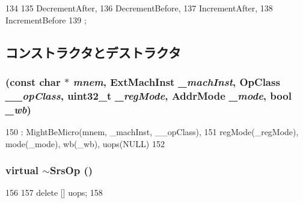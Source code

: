 \begin{DoxyCode}
134                   {
135         DecrementAfter,
136         DecrementBefore,
137         IncrementAfter,
138         IncrementBefore
139     };
\end{DoxyCode}


\subsection{コンストラクタとデストラクタ}
\hypertarget{classArmISA_1_1SrsOp_a9eafbc278cccd5d25089acb0d5c1d10d}{
\subsubsection[{SrsOp}]{ (const char $\ast$ {\em mnem}, \/  {\bf ExtMachInst} {\em \_\-machInst}, \/  OpClass {\em \_\-\_\-opClass}, \/  {\bf uint32\_\-t} {\em \_\-regMode}, \/  {\bf AddrMode} {\em \_\-mode}, \/  bool {\em \_\-wb})}}
\label{classArmISA_1_1SrsOp_a9eafbc278cccd5d25089acb0d5c1d10d}



\begin{DoxyCode}
150         : MightBeMicro(mnem, _machInst, __opClass),
151           regMode(_regMode), mode(_mode), wb(_wb), uops(NULL)
152     {}
\end{DoxyCode}
\hypertarget{classArmISA_1_1SrsOp_a83ecc1fc97159d87d353b296539d1494}{
\subsubsection[{$\sim$SrsOp}]{\setlength{\rightskip}{0pt plus 5cm}virtual $\sim${\bf SrsOp} ()}}
\label{classArmISA_1_1SrsOp_a83ecc1fc97159d87d353b296539d1494}



\begin{DoxyCode}
156     {
157         delete [] uops;
158     }
\end{DoxyCode}


